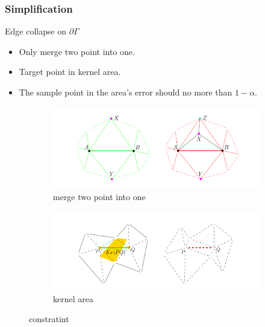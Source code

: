 \documentclass{beamer}
\begin{document}
\begin{frame}
\frametitle{Simplification}
\begin{block}{Edge collapse on $\partial \Gamma$}
  \begin{itemize}
    \item Only merge two point into one.
    \item Target point in kernel area.
    \item The sample point in the area's error should no more than $1-\alpha$.
  \end{itemize}
\end{block}

\begin{figure}
  \centering
  \begin{subfigure}[b]{0.48\textwidth}
    \centering
    \includegraphics[width=\textwidth]{merge_two}
    \caption{merge two point into one}
  \end{subfigure}
  \hfill
  \begin{subfigure}[b]{0.48\textwidth}
    \centering
    \includegraphics[width=\textwidth]{kernel_area}
    \caption{kernel area}
  \end{subfigure}
  \caption{constratint}
\end{figure}
\end{frame}

\end{document}
